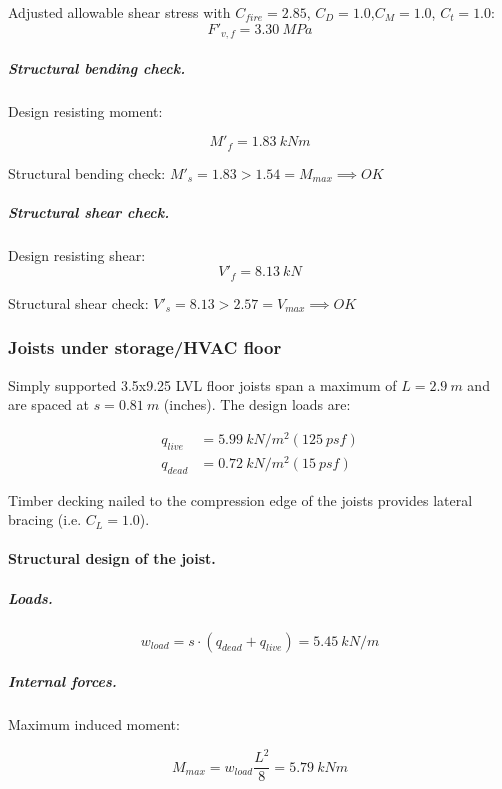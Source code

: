 \noindent Adjusted allowable shear stress with  $C_{fire}= 2.85$, $C_D= 1.0$,$C_M= 1.0$, $C_t= 1.0$:
\begin{equation}
  F'_{v,f}= 3.30\ MPa
\end{equation}

\subparagraph{Structural bending check.}

\noindent Design resisting moment:

\begin{equation}
  M'_f= 1.83\ kN m
\end{equation}

\noindent Structural bending check: $M'_s = 1.83 > 1.54 = M_{max} \implies OK$

\subparagraph{Structural shear check.}

\noindent Design resisting shear:
\begin{equation}
  V'_f= 8.13\ kN
\end{equation}

\noindent Structural shear check: $V'_s = 8.13 > 2.57 = V_{max} \implies OK$

\subsubsection{Joists under storage/HVAC floor}
Simply supported 3.5x9.25 LVL floor joists span a maximum of $L= 2.9\ m$ and are spaced at $s= 0.81\ m$ (\unit[32]{inches}). The design loads are:

\begin{align}
  q_{live}&= 5.99\ kN/m^2 (125\ psf) \\
  q_{dead}&= 0.72\ kN/m^2 (15\ psf)
\end{align}

Timber decking nailed to the compression edge of the joists provides lateral bracing (i.e. $C_L= 1.0$).

\paragraph{Structural design of the joist.}

\subparagraph{Loads.}

\begin{equation}
  w_{load}= s \cdot (q_{dead}+q_{live})= 5.45\ kN/m
\end{equation}

\subparagraph{Internal forces.}

\noindent Maximum induced moment:

\begin{equation}
  M_{max}= w_{load} \frac{L^2}{8}= 5.79\ kN m
\end{equation}

